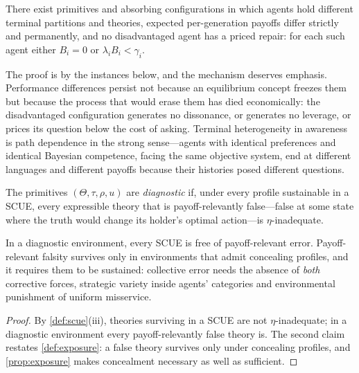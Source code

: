 \begin{proposition}
\label{prop:persistence}
There exist primitives and absorbing configurations in which agents hold
different terminal partitions and theories, expected per-generation payoffs
differ strictly and permanently, and no disadvantaged agent has a priced
repair: for each such agent either $B_i=0$ or $\lambda_iB_i<\gamma_i$.
\end{proposition}

The proof is by the instances below, and the mechanism deserves emphasis.
Performance differences persist not because an equilibrium concept freezes
them but because the process that would erase them has died economically:
the disadvantaged configuration generates no dissonance, or generates no
leverage, or prices its question below the cost of asking.  Terminal
heterogeneity in awareness is path dependence in the strong sense---agents
with identical preferences and identical Bayesian competence, facing the
same objective system, end at different languages and different payoffs
because their histories posed different questions.

\begin{definition}
\label{def:diagnostic}
The primitives $(\Theta,\tau,\rho,u)$ are \emph{diagnostic} if, under every
profile sustainable in a SCUE, every expressible theory that is
payoff-relevantly false---false at some state where the truth would change
its holder's optimal action---is $\eta$-inadequate.
\end{definition}

\begin{proposition}
\label{prop:diagnostic}
In a diagnostic environment, every SCUE is free of payoff-relevant error.
Payoff-relevant falsity survives only in environments that admit concealing
profiles, and it requires them to be sustained: collective error needs the
absence of \emph{both} corrective forces, strategic variety inside agents'
categories and environmental punishment of uniform misservice.
\end{proposition}

\begin{proof}
By \cref{def:scue}(iii), theories surviving in a SCUE are not
$\eta$-inadequate; in a diagnostic environment every payoff-relevantly false
theory is.  The second claim restates \cref{def:exposure}: a false theory
survives only under concealing profiles, and \cref{prop:exposure} makes
concealment necessary as well as sufficient.
\end{proof}

